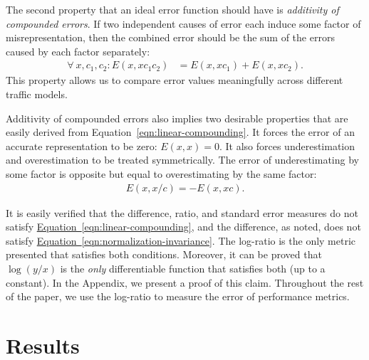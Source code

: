\documentclass[twocolumn,final]{svjour3}
\newcommand{\Equation}[1]{\hyperref[eqn:#1]{Equation~\ref*{eqn:#1}}}
\begin{document}
The second property that an ideal error function should have is  \textit{additivity of compounded errors}. If two independent causes of error each induce some factor of misrepresentation, then the combined error should be the sum of the errors caused by each factor separately:
\begin{align}
\label{eqn:linear-compounding}
\forall\: x,c_1,c_2:
	E(x,x c_1 c_2) &= E(x,x c_1) + E(x,x c_2).
\end{align}
This property allows us to compare error values meaningfully across different traffic models.

Additivity of compounded errors also implies two desirable properties that are easily derived from Equation~\ref{eqn:linear-compounding}. It forces the error of an accurate representation to be zero: $E(x,x) = 0$. It also forces underestimation and overestimation to be treated symmetrically. The error of underestimating by some factor is opposite but equal to overestimating by the same factor:
\begin{align}
E(x,x/c) = - E(x,xc).
\end{align}

It is easily verified that the difference, ratio, and standard error measures do not satisfy \Equation{linear-compounding}, and the difference, as noted, does not satisfy \Equation{normalization-invariance}. The log-ratio is the only metric presented that satisfies both conditions. Moreover, it can be proved that $\log(y/x)$ is the \textit{only} differentiable function that satisfies both (up to a constant). In the Appendix, we present a proof of this claim. Throughout the rest of the paper, we use the log-ratio to measure the error of performance metrics.

\section{Results}
\label{sec:results}
\end{document}
